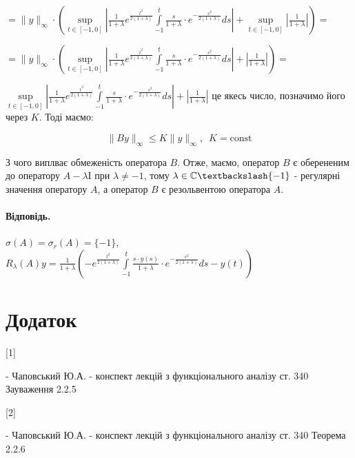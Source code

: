 \documentclass[a5paper, 20pt, titlepage]{article}
\newcommand{\Sup}[1]{\sup \limits_{t \in [-1, 0]} \left| #1 \right|}
\newcommand{\I}{\mathrm{I}}
\begin{document}
\vspace{3mm}
\hspace{7mm}
$= \| y \|_\infty \cdot \left( \Sup{\frac{1}{1 + \lambda} e^{\frac{t^2}{2(1+\lambda)}} \int \limits_{-1}^{t} \frac{s }{1+ \lambda} \cdot e^{-\frac{s^2}{2(1+\lambda)}} ds} + \Sup{\frac{1}{1 + \lambda}}  \right) =$

\vspace{3mm}
\hspace{7mm}
$= \| y \|_\infty \cdot \left( \Sup{\frac{1}{1 + \lambda} e^{\frac{t^2}{2(1+\lambda)}} \int \limits_{-1}^{t} \frac{s }{1+ \lambda} \cdot e^{-\frac{s^2}{2(1+\lambda)}} ds} + \left| \frac{1}{1 + \lambda}  \right| \right) =$

\vspace{5mm}
$\Sup{\frac{1}{1 + \lambda} e^{\frac{t^2}{2(1+\lambda)}} \int \limits_{-1}^{t} \frac{s }{1+ \lambda} \cdot e^{-\frac{s^2}{2(1+\lambda)}} ds} + \left| \frac{1}{1 + \lambda} \right|$ це якесь число, позначимо його через $K$. Тоді маємо: 

$$ \| B y\|_\infty \leqslant K \| y \|_\infty, \,\,\, K = \text{const} $$

З чого виплває обмеженість оператора $B$. Отже, маємо, оператор $B$ є оберененим до оператору $A - \lambda \I$ при $\lambda \neq -1$, тому $ \lambda \in \mathbb{C} \textbackslash \{-1\}$ - регулярні значення оператору $A$, а оператор $B$ є резольвентою оператора \nolinebreak $A$.


\vspace{2mm}
\paragraph{Відповідь.} $\sigma(A) = \sigma_r(A) = \{-1\}$, $R_\lambda(A)y = \frac{1}{1 + \lambda} \left( - e^{\frac{t^2}{2(1+\lambda)}} \int \limits_{-1}^{t} \frac{s \cdot y(s)}{1+ \lambda} \cdot e^{-\frac{s^2}{2(1+\lambda)}} ds - y(t)\right) $


\vspace{6mm}
\section*{Додаток} 

\hypertarget{1}{[1]} - Чаповський Ю.А. - конспект лекцій з функціонального аналізу  ст. 340 Зауваження 2.2.5

\hspace{-6.3mm}
\hypertarget{2}{[2]}  - Чаповський Ю.А. - конспект лекцій з функціонального аналізу  ст. 340 Теорема 2.2.6
\end{document}
